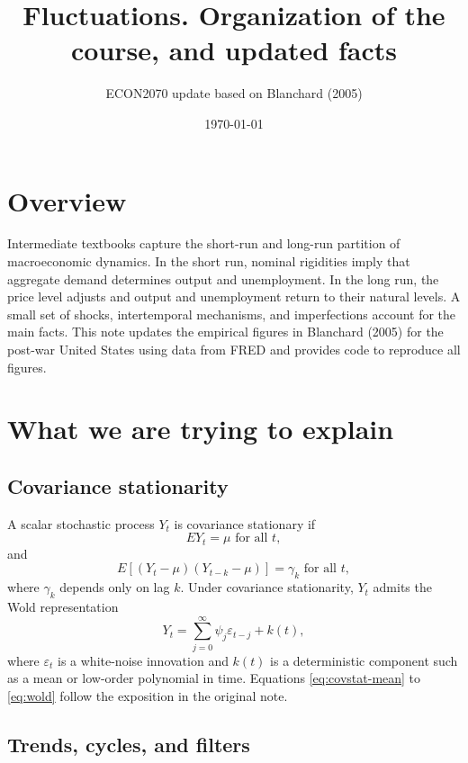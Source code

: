 \documentclass[11pt]{article}
\title{Fluctuations. Organization of the course, and updated facts}
\author{ECON2070 update based on Blanchard (2005)}
\date{\today}
\begin{document}
\maketitle

\section{Overview}

Intermediate textbooks capture the short-run and long-run partition of macroeconomic dynamics. In the short run, nominal rigidities imply that aggregate demand determines output and unemployment. In the long run, the price level adjusts and output and unemployment return to their natural levels. A small set of shocks, intertemporal mechanisms, and imperfections account for the main facts. This note updates the empirical figures in Blanchard (2005) for the post-war United States using data from FRED and provides code to reproduce all figures.

\section{What we are trying to explain}

\subsection{Covariance stationarity}

A scalar stochastic process $Y_t$ is covariance stationary if
\begin{equation}
E Y_t = \mu \text{ for all } t, \label{eq:covstat-mean}
\end{equation}
and
\begin{equation}
E\left[(Y_t - \mu)(Y_{t-k} - \mu)\right] = \gamma_k \text{ for all } t, \label{eq:covstat-autocov}
\end{equation}
where $\gamma_k$ depends only on lag $k$. Under covariance stationarity, $Y_t$ admits the Wold representation
\begin{equation}
Y_t = \sum_{j=0}^{\infty} \psi_j \varepsilon_{t-j} + k(t), \label{eq:wold}
\end{equation}
where $\varepsilon_t$ is a white-noise innovation and $k(t)$ is a deterministic component such as a mean or low-order polynomial in time. Equations \ref{eq:covstat-mean} to \ref{eq:wold} follow the exposition in the original note. 

\subsection{Trends, cycles, and filters}
\end{document}
